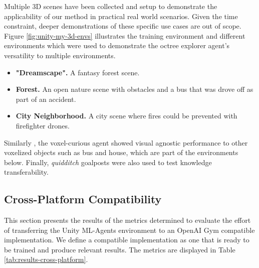 Multiple 3D scenes have been collected and setup to demonstrate the applicability of our method in practical real world scenarios. Given the time constraint, deeper demonstrations of these specific use cases are out of scope.
Figure \ref{fig:unity-my-3d-envs} illustrates the training environment and different environments which were used to demonstrate the octree explorer agent's versatility to multiple environments.
\begin{itemize}
    \item \textbf{"Dreamscape".} A fantasy forest scene.
    \item \textbf{Forest.} An open nature scene with obstacles and a bus that was drove off as part of an accident.
    \item \textbf{City Neighborhood.} A city scene where fires could be prevented with firefighter drones.
\end{itemize}

Similarly , the voxel-curious agent showed visual agnostic performance to other voxelized objects such as bus and house, which are part of the environments below. Finally, \textit{quidditch} goalposts were also used to test knowledge transferability.





\subsection{Cross-Platform Compatibility}
This section presents the results of the metrics determined to evaluate the effort of transferring the Unity ML-Agents environment to an OpenAI Gym compatible implementation. We define a compatible implementation as one that is ready to be trained and produce relevant results. The metrics are displayed in Table \ref{tab:results-cross-platform}.

